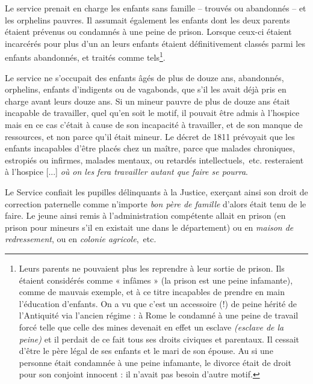  Le service prenait en charge les enfants sans famille -- trouvés ou abandonnés -- et les orphelins pauvres. Il assumait également les enfants dont les deux parents étaient prévenus ou condamnés à une peine de prison. Lorsque ceux-ci étaient incarcérés pour plus d'un an leurs enfants étaient définitivement classés parmi les enfants abandonnés, et traités comme tels\footnote{Leurs parents ne pouvaient plus les reprendre à leur sortie de prison. Ils étaient considérés comme « infâmes » (la prison est une peine infamante), comme de mauvais exemple, et à ce titre incapables de prendre en main l'éducation d'enfants. On a vu que c'est un accessoire (!) de peine hérité de l'Antiquité via l'ancien régime : à Rome le condamné à une peine de travail forcé telle que celle des mines devenait en effet  un esclave \emph{(esclave de la peine)} et il perdait de ce fait tous ses droits civiques et parentaux. Il cessait d'être le père légal de ses enfants et le mari de son épouse. Au  si une personne était condamnée à une peine infamante, le divorce était de droit pour son conjoint innocent : il n'avait pas besoin d'autre motif.}. 
 
 
 
 Le service ne s'occupait des enfants âgés de plus de douze ans, abandonnés, orphelins, enfants d'indigents ou de vagabonds, que s'il les avait déjà pris en charge avant leurs douze ans. Si un mineur pauvre de plus de douze ans était incapable de travailler, quel qu'en soit le motif, il pouvait être admis à l'hospice mais en ce cas c'était à cause de son incapacité à travailler, et de son manque de ressources, et non parce qu'il était mineur. Le décret de 1811 prévoyait que les enfants incapables d'être placés chez un maître, parce que malades chroniques, estropiés ou infirmes, malades mentaux, ou retardés intellectuels,~etc. resteraient à l'hospice [...] \emph{où on les fera travailler autant que faire se pourra}.

 Le Service confiait les pupilles délinquants à la Justice, exerçant ainsi son droit de correction paternelle comme n'importe \emph{bon père de famille} d'alors était tenu de le faire. Le jeune ainsi remis à l'administration compétente allait en prison (en prison pour mineurs s'il en existait une dans le département) ou en \emph{maison de redressement}, ou en \emph{colonie agricole},~etc. 


